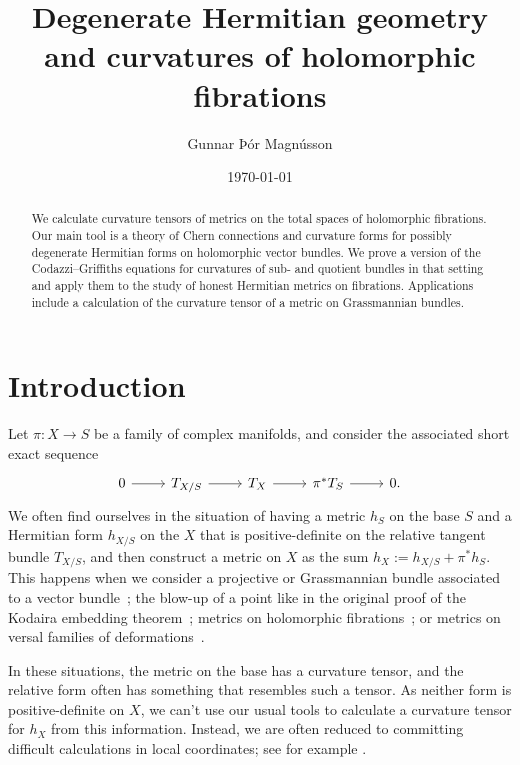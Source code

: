 \documentclass[10pt,a4paper]{amsart}
\author{Gunnar Þór Magnússon}
\date{\today}
\title[Degenerate Hermitian geometry]{Degenerate Hermitian geometry\\
and curvatures of holomorphic fibrations}
\theoremstyle{definition}
\begin{document}
\begin{abstract}
We calculate curvature tensors of metrics on the total spaces of holomorphic fibrations. Our main tool is a theory of Chern connections and curvature forms for possibly degenerate Hermitian forms on holomorphic vector bundles. We prove a version of the Codazzi--Griffiths equations for curvatures of sub- and quotient bundles in that setting and apply them to the study of honest Hermitian metrics on fibrations. Applications include a calculation of the curvature tensor of a metric on Grassmannian bundles.
\end{abstract}


\maketitle






\section*{Introduction}

Let $\pi : X \to S$ be a family of complex manifolds, and consider the associated short exact sequence
\[
\begin{tikzcd}
0 \ar[r] & T_{X/S} \ar[r] & T_X \ar[r] & \pi^*T_S \ar[r] & 0.
\end{tikzcd}
\]
We often find ourselves in the situation of having a metric $h_S$ on the base $S$ and a Hermitian form $h_{X/S}$ on the $X$ that is positive-definite on the relative tangent bundle $T_{X/S}$, and then construct a metric on $X$ as the sum $h_X := h_{X/S} + \pi^*h_S$. This happens when we consider a projective or Grassmannian bundle associated to a vector bundle~\cite{alvarez2016positive,alvarez2018projectivized,yang2019hirzebruch}; the blow-up of a point like in the original proof of the Kodaira embedding theorem~\cite{kodaira-embedding}; metrics on holomorphic fibrations~\cite{calabi-fibres-holomorphes}; or metrics on versal families of deformations~\cite{magnusson2012natural}.

In these situations, the metric on the base has a curvature tensor, and the relative form often has something that resembles such a tensor. As neither form is positive-definite on $X$, we can't use our usual tools to calculate a curvature tensor for $h_X$ from this information. Instead, we are often reduced to committing difficult calculations in local coordinates; see for example \cite{chaturvedi2019hermitian}.
\end{document}
